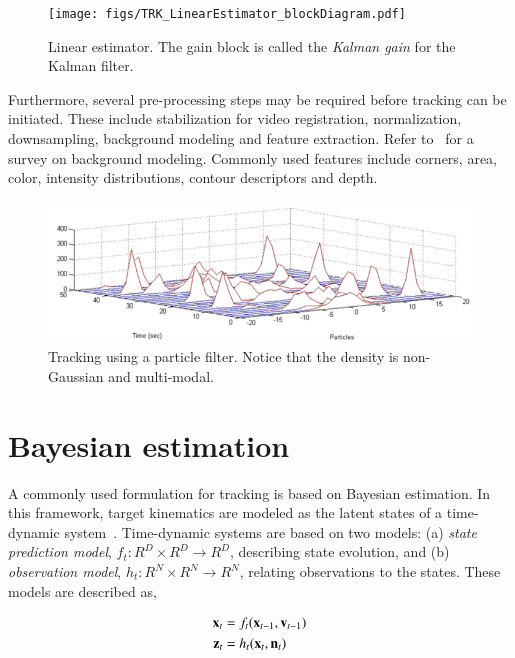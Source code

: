 								\begin{figure}[t]
								\center
								\texttt{[image: figs/TRK\_LinearEstimator\_blockDiagram.pdf]}
								\caption{Linear estimator.  The gain block is called the \emph{Kalman gain} for the Kalman filter.}
								\label{TRK_overviewDiagram}
								\end{figure}

Furthermore, several pre-processing steps may be required before tracking can be initiated.  These include stabilization for video registration, normalization, downsampling, background modeling and feature extraction.  Refer to~\cite{1999_CNF_Wallflower_Toyama} for a survey on background modeling. Commonly used features include corners, area, color, intensity distributions, contour descriptors and depth.

								\begin{figure}[t]
								\center
								\includegraphics[width=1.0\textwidth]{figs/TRK_ParticleFilter_multimodalPDF_part.png}
								\caption{Tracking using a particle filter.  Notice that the density is non-Gaussian and multi-modal.}
								\label{fig:particle_filter_multi_modal_density}
								\end{figure}



\section{Bayesian estimation}
A commonly used formulation for tracking is based on Bayesian estimation.  In this framework, target kinematics are modeled as the latent states of a time-dynamic system~\cite{2002_JNL_PF_Arulampalam}.  Time-dynamic systems are based on two models: (a) \emph{state prediction model}, ${f_t:R^D \times R^D \rightarrow R^D}$, describing state evolution, and (b) \emph{observation model}, ${h_t:R^N \times R^N \rightarrow R^N}$, relating observations to the states.  These models are described as,

\begin{align}
\mathbf{x}_t &= f_t(\mathbf{x}_{t-1}, \mathbf{v}_{t-1}) \notag\\
\mathbf{z}_t &= h_t(\mathbf{x}_t, \mathbf{n}_t)
\label{Eq:TDS}
\end{align}


